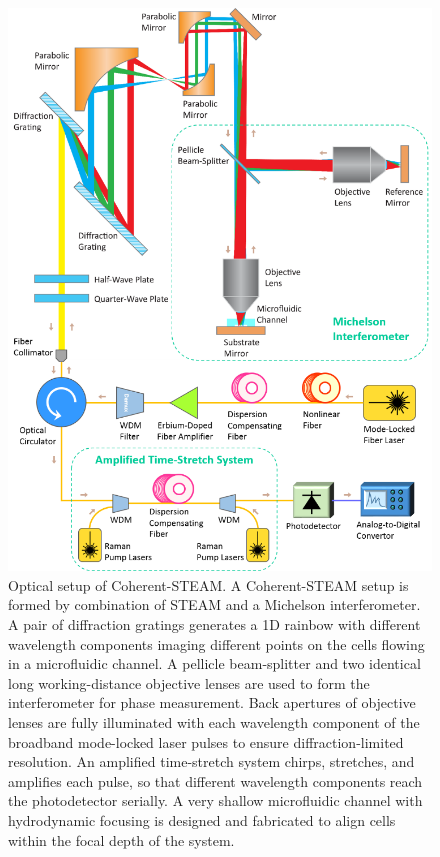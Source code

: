 \begin{figure}[htb!]
\centering
\includegraphics[scale=1]{BOE2013/Figure1.png}
\caption{Optical setup of Coherent-STEAM. A Coherent-STEAM setup is formed by combination of STEAM and a Michelson interferometer. A pair of diffraction gratings generates a 1D rainbow with different wavelength components imaging different points on the cells flowing in a microfluidic channel. A pellicle beam-splitter and two identical long working-distance objective lenses are used to form the interferometer for phase measurement. Back apertures of objective lenses are fully illuminated with each wavelength component of the broadband mode-locked laser pulses to ensure diffraction-limited resolution. An amplified time-stretch system chirps, stretches, and amplifies each pulse, so that different wavelength components reach the photodetector serially. A very shallow microfluidic channel with hydrodynamic focusing is designed and fabricated to align cells within the focal depth of the system.}
\label{fig:BOE2013_Figure1}
\end{figure}

